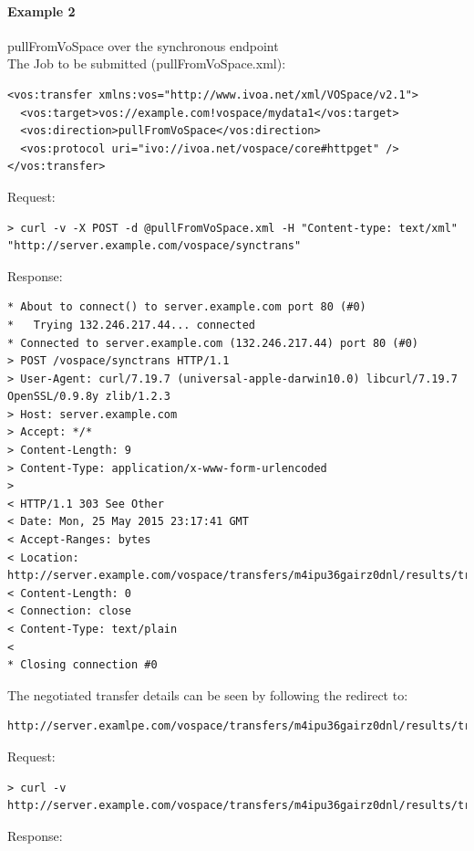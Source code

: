 \documentclass[11pt,a4paper]{ivoa}
\begin{document}
\paragraph{Example 2}
pullFromVoSpace over the synchronous endpoint
\\[5px]
\noindent
The Job to be submitted (pullFromVoSpace.xml):
\begin{lstlisting}
<vos:transfer xmlns:vos="http://www.ivoa.net/xml/VOSpace/v2.1">
  <vos:target>vos://example.com!vospace/mydata1</vos:target>
  <vos:direction>pullFromVoSpace</vos:direction>
  <vos:protocol uri="ivo://ivoa.net/vospace/core#httpget" />
</vos:transfer>
\end{lstlisting}
Request:
\begin{lstlisting}
> curl -v -X POST -d @pullFromVoSpace.xml -H "Content-type: text/xml" "http://server.example.com/vospace/synctrans"
\end{lstlisting}
Response:
\begin{lstlisting}
* About to connect() to server.example.com port 80 (#0)
*   Trying 132.246.217.44... connected
* Connected to server.example.com (132.246.217.44) port 80 (#0)
> POST /vospace/synctrans HTTP/1.1
> User-Agent: curl/7.19.7 (universal-apple-darwin10.0) libcurl/7.19.7 OpenSSL/0.9.8y zlib/1.2.3
> Host: server.example.com
> Accept: */*
> Content-Length: 9
> Content-Type: application/x-www-form-urlencoded
>
< HTTP/1.1 303 See Other
< Date: Mon, 25 May 2015 23:17:41 GMT
< Accept-Ranges: bytes
< Location: http://server.example.com/vospace/transfers/m4ipu36gairz0dnl/results/transferDetails
< Content-Length: 0
< Connection: close
< Content-Type: text/plain
<
* Closing connection #0
\end{lstlisting}
The negotiated transfer details can be seen by following the redirect to:
\begin{lstlisting}
http://server.examlpe.com/vospace/transfers/m4ipu36gairz0dnl/results/transferDetails
\end{lstlisting}
Request:
\begin{lstlisting}
> curl -v http://server.example.com/vospace/transfers/m4ipu36gairz0dnl/results/transferDetails
\end{lstlisting}
Response:
\end{document}
